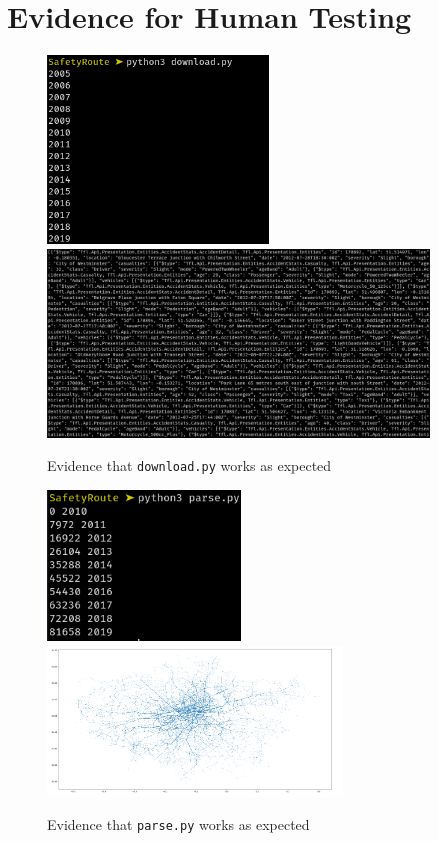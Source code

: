 \documentclass[11pt,twoside,a4paper]{report}
\begin{document}
\chapter{Evidence for Human Testing}
\begin{figure}[h]
    \begin{center}
        \includegraphics[height=5cm]{downloadrun.png}\includegraphics[height=5cm]{downloadproof.png}
    \end{center}
    \caption{Evidence that \texttt{download.py} works as expected}
    \label{downloadevidence}
\end{figure}
\begin{figure}[h]
    \begin{center}
        \includegraphics[height=4cm]{parserun.png}\includegraphics[height=4cm]{chart.png}
    \end{center}
    \caption{Evidence that \texttt{parse.py} works as expected}
    \label{parsevidence}
\end{figure}
\end{document}
